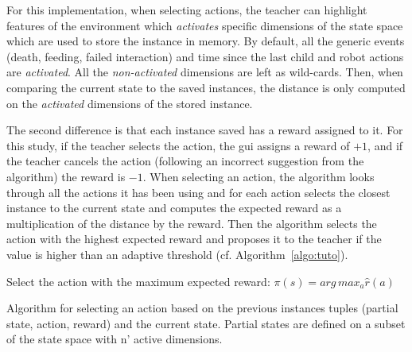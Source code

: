 For this implementation, when selecting actions, the teacher can highlight features of the environment which \emph{activates} specific dimensions of the state space which are used to store the instance in memory. By default, all the generic events (death, feeding, failed interaction) and time since the last child and robot actions are \emph{activated}. All the \emph{non-activated} dimensions are left as wild-cards. Then, when comparing the current state to the saved instances, the distance is only computed on the \emph{activated} dimensions of the stored instance. 

The second difference is that each instance saved has a reward assigned to it. For this study, if the teacher selects the action, the \gls{gui} assigns a reward of $+1$, and if the teacher cancels the action (following an incorrect suggestion from the algorithm) the reward is $-1$. When selecting an action, the algorithm looks through all the actions it has been using and for each action selects the closest instance to the current state and computes the expected reward as a multiplication of the distance by the reward. Then the algorithm selects the action with the highest expected reward and proposes it to the teacher if the value is higher than an adaptive threshold (cf. Algorithm~\ref{algo:tuto}). 

\begin{algorithm}
	\DontPrintSemicolon
	Select the action with the maximum expected reward:
	$\pi(s) = arg\, max_{a} \hat{r}(a)$
	
	
	\caption{Algorithm for selecting an action based on the previous instances tuples (partial state, action, reward) and the current state. Partial states are defined on a subset of the state space with n' active dimensions.}
	\label{algo:tuto}
\end{algorithm}

